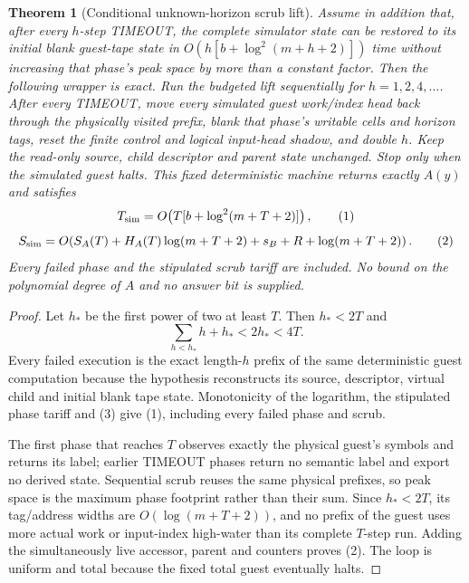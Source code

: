 \documentclass[11pt]{article}
\newtheorem{theorem}{Theorem}
\begin{document}
\begin{theorem}[Conditional unknown-horizon scrub lift]\label{th:scrub}
Assume in addition that, after every $h$-step TIMEOUT, the complete simulator
state can be restored to its initial blank guest-tape state in
$O(h[b+\log^2(m+h+2)])$ time without increasing that phase's peak space by more
than a constant factor.  Then the following wrapper is exact.
Run the budgeted lift sequentially for $h=1,2,4,\ldots$.  After every TIMEOUT,
move every simulated guest work/index head back through the physically visited
prefix, blank that phase's writable cells and horizon tags, reset the finite
control and logical input-head shadow, and double $h$.  Keep the read-only source,
child descriptor and parent state unchanged.  Stop only when the simulated guest
halts.  This fixed deterministic machine returns exactly $A(y)$ and satisfies
\[
 T_{\rm sim}=O\!\left(T[b+\log^2(m+T+2)]\right),                         \tag{1}
\]
\[
 S_{\rm sim}=O\!\left(S_A(T)+H_A(T)\log(m+T+2)+s_B+R+\log(m+T+2)\right). \tag{2}
\]
Every failed phase and the stipulated scrub tariff are included.  No bound on
the polynomial degree of $A$ and no answer bit is supplied.
\end{theorem}
\begin{proof}
Let $h_*$ be the first power of two at least $T$.  Then $h_*<2T$ and
\[
 \sum_{h<h_*}h+h_*<2h_*<4T.                                            \tag{3}
\]
Every failed execution is the exact length-$h$ prefix of the same deterministic
guest computation because the hypothesis reconstructs its source, descriptor,
virtual child and initial blank tape state.  Monotonicity of the logarithm, the
stipulated phase tariff and (3) give (1), including every failed phase and scrub.

The first phase that reaches $T$ observes exactly the physical guest's symbols
and returns its label; earlier TIMEOUT phases return no semantic label and export
no derived state.  Sequential scrub reuses the same physical prefixes, so peak
space is the maximum phase footprint rather than their sum.  Since
$h_*<2T$, its tag/address widths are $O(\log(m+T+2))$, and no prefix of the guest
uses more actual work or input-index high-water than its complete $T$-step run.
Adding the simultaneously live accessor, parent and counters proves (2).
The loop is uniform and total because the fixed total guest eventually halts.
\end{proof}
\end{document}
